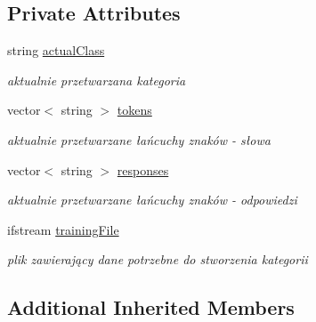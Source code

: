 \subsection*{Private Attributes}
\begin{DoxyCompactItemize}
\item 
\mbox{\label{class_category_creator_a3332317985ddb3cac71dd13ad27fc12a}} 
string \mbox{\hyperlink{class_category_creator_a3332317985ddb3cac71dd13ad27fc12a}{actual\+Class}}
\begin{DoxyCompactList}\small\item\em aktualnie przetwarzana kategoria \end{DoxyCompactList}\item 
\mbox{\label{class_category_creator_ae2322d7b74a0619b8af07ab1e9b079e6}} 
vector$<$ string $>$ \mbox{\hyperlink{class_category_creator_ae2322d7b74a0619b8af07ab1e9b079e6}{tokens}}
\begin{DoxyCompactList}\small\item\em aktualnie przetwarzane łańcuchy znaków -\/ słowa \end{DoxyCompactList}\item 
\mbox{\label{class_category_creator_a39cacc544e00f614021aab4179b87be4}} 
vector$<$ string $>$ \mbox{\hyperlink{class_category_creator_a39cacc544e00f614021aab4179b87be4}{responses}}
\begin{DoxyCompactList}\small\item\em aktualnie przetwarzane łańcuchy znaków -\/ odpowiedzi \end{DoxyCompactList}\item 
\mbox{\label{class_category_creator_a1e217c8444580c05bc16eae7213a187a}} 
ifstream \mbox{\hyperlink{class_category_creator_a1e217c8444580c05bc16eae7213a187a}{training\+File}}
\begin{DoxyCompactList}\small\item\em plik zawierający dane potrzebne do stworzenia kategorii \end{DoxyCompactList}\end{DoxyCompactItemize}
\subsection*{Additional Inherited Members}


